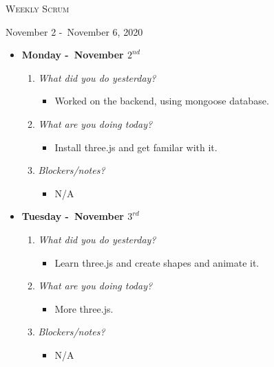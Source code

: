 \centerline{\LARGE\textsc{Weekly Scrum}}
\centerline{November 2 -\ November 6, 2020}
\textbf{}
\begin{itemize}
  \item[] \textbf{\large Monday -\ November \(2^{nd}\)}
  \begin{enumerate}
    \item \textsl{What did you do yesterday?}
    \begin{itemize}
      \item Worked on the backend, using mongoose database.
    \end{itemize}
    \item \textsl{What are you doing today?}
    \begin{itemize}
      \item Install three.js and get familar with it.
    \end{itemize}
    \item \textsl{Blockers/notes?}
    \begin{itemize}
      \item N/A
    \end{itemize}
  \end{enumerate}
\end{itemize}
\textbf{}
\begin{itemize}
  \item[] \textbf{\large Tuesday -\ November \(3^{rd}\)}
  \begin{enumerate}
    \item \textsl{What did you do yesterday?}
    \begin{itemize}
      \item Learn three.js and create shapes and animate it.
    \end{itemize}
    \item \textsl{What are you doing today?}
    \begin{itemize}
      \item More three.js.
    \end{itemize}
    \item \textsl{Blockers/notes?}
    \begin{itemize}
      \item N/A
    \end{itemize}
  \end{enumerate}
\end{itemize}
\textbf{}
